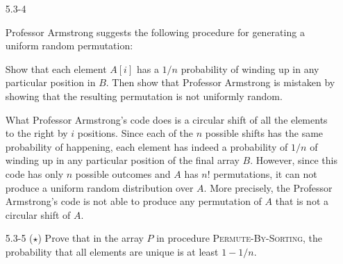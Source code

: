 \documentclass{report}
\makeatletter
\renewenvironment{framed}{%
 \def\FrameCommand##1{\hskip\@totalleftmargin
 \fboxsep=\FrameSep\fbox{##1}}%
 \MakeFramed {\advance\hsize-\width
   \@totalleftmargin\z@ \linewidth\hsize
   \@setminipage}}%
 {\par\unskip\endMakeFramed}
\makeatother
\begin{document}
\begin{enumerate}
\newpage

\item[5.3{-}4]{Professor Armstrong suggests the following procedure for
generating a uniform random permutation:

\begin{algorithm}[H]
\SetAlgoNoEnd\DontPrintSemicolon
\BlankLine
{}
\end{algorithm}

Show that each element $A[i]$ has a $1/n$ probability of winding up in any
particular position in $B$. Then show that Professor Armstrong is mistaken by
showing that the resulting permutation is not uniformly random.
}

\begin{framed}
What Professor Armstrong's code does is a circular shift of all the elements to
the right by $i$ positions. Since each of the $n$ possible shifts has the same
probability of happening, each element has indeed a probability of $1/n$ of
winding up in any particular position of the final array $B$. However, since
this code has only $n$ possible outcomes and $A$ has $n!$ permutations, it can
not produce a uniform random distribution over $A$. More precisely, the
Professor Armstrong's code is not able to produce any permutation of $A$ that
is not a circular shift of $A$.
\end{framed}

\item[5.3{-}5]{($\star$) Prove that in the array $P$ in procedure
\textsc{Permute-By-Sorting}, the probability that all elements are unique is at
least $1 - 1/n$.}


\end{enumerate}
\end{document}
